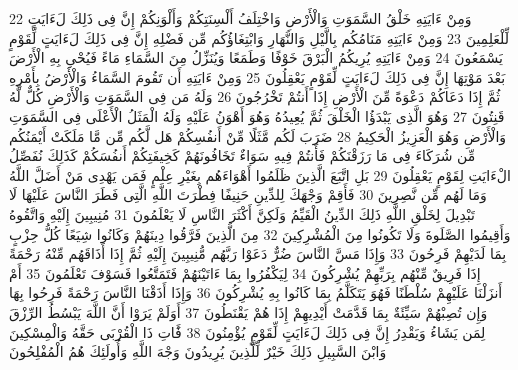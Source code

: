 \documentclass[20pt,a4paper]{article}
\begin{document}
{\tiny\colorbox{cl_aya}{22}} وَمِنْ ءَايَتِهِ خَلْقُ السَّمَوَتِ وَالْأَرْضِ وَاخْتِلَفُ أَلْسِنَتِكُمْ وَأَلْوَنِكُمْ إِنَّ فِى ذَلِكَ لَءَايَتٍ لِّلْعَلِمِينَ
{\tiny\colorbox{cl_aya}{23}} وَمِنْ ءَايَتِهِ مَنَامُكُم بِالَّيْلِ وَالنَّهَارِ وَابْتِغَاؤُكُم مِّن فَضْلِهِ إِنَّ فِى ذَلِكَ لَءَايَتٍ لِّقَوْمٍ يَسْمَعُونَ
{\tiny\colorbox{cl_aya}{24}} وَمِنْ ءَايَتِهِ يُرِيكُمُ الْبَرْقَ خَوْفًا وَطَمَعًا وَيُنَزِّلُ مِنَ السَّمَاءِ مَاءً فَيُحْىِ بِهِ الْأَرْضَ بَعْدَ مَوْتِهَا إِنَّ فِى ذَلِكَ لَءَايَتٍ لِّقَوْمٍ يَعْقِلُونَ
{\tiny\colorbox{cl_aya}{25}} وَمِنْ ءَايَتِهِ أَن تَقُومَ السَّمَاءُ وَالْأَرْضُ بِأَمْرِهِ ثُمَّ إِذَا دَعَاكُمْ دَعْوَةً مِّنَ الْأَرْضِ إِذَا أَنتُمْ تَخْرُجُونَ
{\tiny\colorbox{cl_aya}{26}} وَلَهُ مَن فِى السَّمَوَتِ وَالْأَرْضِ كُلٌّ لَّهُ قَنِتُونَ
{\tiny\colorbox{cl_aya}{27}} وَهُوَ الَّذِى يَبْدَؤُا الْخَلْقَ ثُمَّ يُعِيدُهُ وَهُوَ أَهْوَنُ عَلَيْهِ وَلَهُ الْمَثَلُ الْأَعْلَى فِى السَّمَوَتِ وَالْأَرْضِ وَهُوَ الْعَزِيزُ الْحَكِيمُ
{\tiny\colorbox{cl_aya}{28}} ضَرَبَ لَكُم مَّثَلًا مِّنْ أَنفُسِكُمْ هَل لَّكُم مِّن مَّا مَلَكَتْ أَيْمَنُكُم مِّن شُرَكَاءَ فِى مَا رَزَقْنَكُمْ فَأَنتُمْ فِيهِ سَوَاءٌ تَخَافُونَهُمْ كَخِيفَتِكُمْ أَنفُسَكُمْ كَذَلِكَ نُفَصِّلُ الْءَايَتِ لِقَوْمٍ يَعْقِلُونَ
{\tiny\colorbox{cl_aya}{29}} بَلِ اتَّبَعَ الَّذِينَ ظَلَمُوا أَهْوَاءَهُم بِغَيْرِ عِلْمٍ فَمَن يَهْدِى مَنْ أَضَلَّ اللَّهُ وَمَا لَهُم مِّن نَّصِرِينَ
{\tiny\colorbox{cl_aya}{30}} فَأَقِمْ وَجْهَكَ لِلدِّينِ حَنِيفًا فِطْرَتَ اللَّهِ الَّتِى فَطَرَ النَّاسَ عَلَيْهَا لَا تَبْدِيلَ لِخَلْقِ اللَّهِ ذَلِكَ الدِّينُ الْقَيِّمُ وَلَكِنَّ أَكْثَرَ النَّاسِ لَا يَعْلَمُونَ
{\tiny\colorbox{cl_aya}{31}} مُنِيبِينَ إِلَيْهِ وَاتَّقُوهُ وَأَقِيمُوا الصَّلَوةَ وَلَا تَكُونُوا مِنَ الْمُشْرِكِينَ
{\tiny\colorbox{cl_aya}{32}} مِنَ الَّذِينَ فَرَّقُوا دِينَهُمْ وَكَانُوا شِيَعًا كُلُّ حِزْبٍ بِمَا لَدَيْهِمْ فَرِحُونَ
{\tiny\colorbox{cl_aya}{33}} وَإِذَا مَسَّ النَّاسَ ضُرٌّ دَعَوْا رَبَّهُم مُّنِيبِينَ إِلَيْهِ ثُمَّ إِذَا أَذَاقَهُم مِّنْهُ رَحْمَةً إِذَا فَرِيقٌ مِّنْهُم بِرَبِّهِمْ يُشْرِكُونَ
{\tiny\colorbox{cl_aya}{34}} لِيَكْفُرُوا بِمَا ءَاتَيْنَهُمْ فَتَمَتَّعُوا فَسَوْفَ تَعْلَمُونَ
{\tiny\colorbox{cl_aya}{35}} أَمْ أَنزَلْنَا عَلَيْهِمْ سُلْطَنًا فَهُوَ يَتَكَلَّمُ بِمَا كَانُوا بِهِ يُشْرِكُونَ
{\tiny\colorbox{cl_aya}{36}} وَإِذَا أَذَقْنَا النَّاسَ رَحْمَةً فَرِحُوا بِهَا وَإِن تُصِبْهُمْ سَيِّئَةٌ بِمَا قَدَّمَتْ أَيْدِيهِمْ إِذَا هُمْ يَقْنَطُونَ
{\tiny\colorbox{cl_aya}{37}} أَوَلَمْ يَرَوْا أَنَّ اللَّهَ يَبْسُطُ الرِّزْقَ لِمَن يَشَاءُ وَيَقْدِرُ إِنَّ فِى ذَلِكَ لَءَايَتٍ لِّقَوْمٍ يُؤْمِنُونَ
{\tiny\colorbox{cl_aya}{38}} فََٔاتِ ذَا الْقُرْبَى حَقَّهُ وَالْمِسْكِينَ وَابْنَ السَّبِيلِ ذَلِكَ خَيْرٌ لِّلَّذِينَ يُرِيدُونَ وَجْهَ اللَّهِ وَأُولَئِكَ هُمُ الْمُفْلِحُونَ
\end{document}
